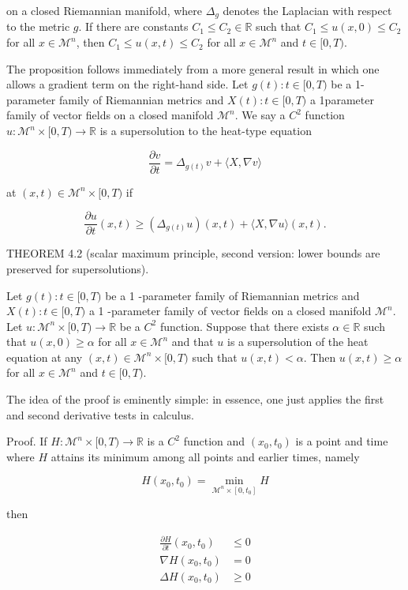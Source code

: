 \documentclass[10pt, letterpaper]{article}
\begin{document}
on a closed Riemannian manifold, where $\Delta_g$ denotes the Laplacian with respect to the metric $g$. If there are constants $C_1 \leq C_2 \in \mathbb{R}$ such that $C_1 \leq u(x, 0) \leq C_2$ for all $x \in \mathcal{M}^n$, then $C_1 \leq u(x, t) \leq C_2$ for all $x \in \mathcal{M}^n$ and $t \in[0, T)$.

The proposition follows immediately from a more general result in which one allows a gradient term on the right-hand side. Let $g(t): t \in[0, T)$ be a 1-parameter family of Riemannian metrics and $X(t): t \in[0, T)$ a 1parameter family of vector fields on a closed manifold $\mathcal{M}^n$. We say a $C^2$ function $u: \mathcal{M}^n \times[0, T) \rightarrow \mathbb{R}$ is a supersolution to the heat-type equation

$$
\frac{\partial v}{\partial t}=\Delta_{g(t)} v+\langle X, \nabla v\rangle
$$

at $(x, t) \in \mathcal{M}^n \times[0, T)$ if

$$
\frac{\partial u}{\partial t}(x, t) \geq\left(\Delta_{g(t)} u\right)(x, t)+\langle X, \nabla u\rangle(x, t) .
$$


THEOREM 4.2 (scalar maximum principle, second version: lower bounds are preserved for supersolutions). 

Let $g(t): t \in[0, T)$ be a 1 -parameter family of Riemannian metrics and $X(t): t \in[0, T)$ a 1 -parameter family of vector fields on a closed manifold $\mathcal{M}^n$. Let $u: \mathcal{M}^n \times[0, T) \rightarrow \mathbb{R}$ be a $C^2$ function. Suppose that there exists $\alpha \in \mathbb{R}$ such that $u(x, 0) \geq \alpha$ for all $x \in \mathcal{M}^n$ and that $u$ is a supersolution of the heat equation at any $(x, t) \in \mathcal{M}^n \times[0, T)$ such that $u(x, t)<\alpha$. Then $u(x, t) \geq \alpha$ for all $x \in \mathcal{M}^n$ and $t \in[0, T)$.

The idea of the proof is eminently simple: in essence, one just applies the first and second derivative tests in calculus.

Proof. If $H: \mathcal{M}^n \times[0, T) \rightarrow \mathbb{R}$ is a $C^2$ function and $\left(x_0, t_0\right)$ is a point and time where $H$ attains its minimum among all points and earlier times, namely

$$
H\left(x_0, t_0\right)=\min _{\mathcal{M}^n \times\left[0, t_0\right]} H
$$

then

$$
\begin{aligned}
\frac{\partial H}{\partial t}\left(x_0, t_0\right) & \leq 0 \\
\nabla H\left(x_0, t_0\right) & =0 \\
\Delta H\left(x_0, t_0\right) & \geq 0
\end{aligned}
$$
\end{document}

